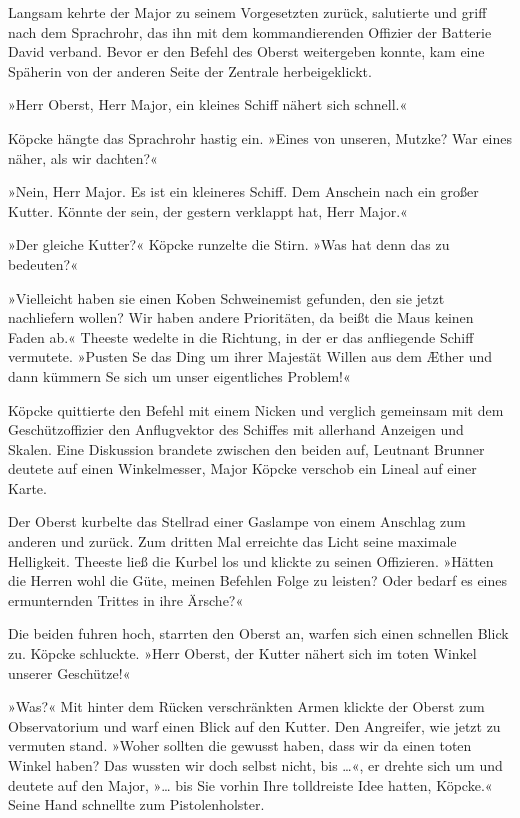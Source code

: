 Langsam kehrte der Major zu seinem Vorgesetzten zurück, salutierte
und griff nach dem Sprachrohr, das ihn mit dem kommandierenden
Offizier der Batterie David verband. Bevor er den Befehl des Oberst
weitergeben konnte, kam eine Späherin von der anderen Seite der
Zentrale herbeigeklickt.

»Herr Oberst, Herr Major, ein kleines Schiff nähert sich schnell.«

Köpcke hängte das Sprachrohr hastig ein. »Eines von unseren,
Mutzke? War eines näher, als wir dachten?«

»Nein, Herr Major. Es ist ein kleineres Schiff. Dem Anschein nach
ein großer Kutter. Könnte der sein, der gestern verklappt hat, Herr
Major.«

»Der gleiche Kutter?« Köpcke runzelte die Stirn. »Was hat denn das
zu bedeuten?«

»Vielleicht haben sie einen Koben Schweinemist gefunden, den sie
jetzt nachliefern wollen? Wir haben andere Prioritäten, da beißt
die Maus keinen Faden ab.« Theeste wedelte in die Richtung, in der
er das anfliegende Schiff vermutete. »Pusten Se das Ding um ihrer
Majestät Willen aus dem Æther und dann kümmern Se sich um unser
eigentliches Problem!«

Köpcke quittierte den Befehl mit einem Nicken und verglich
gemeinsam mit dem Geschützoffizier den Anflugvektor des Schiffes
mit allerhand Anzeigen und Skalen. Eine Diskussion brandete
zwischen den beiden auf, Leutnant Brunner deutete auf einen
Winkelmesser, Major Köpcke verschob ein Lineal auf einer Karte.

Der Oberst kurbelte das Stellrad einer Gaslampe von einem Anschlag
zum anderen und zurück. Zum dritten Mal erreichte das Licht seine
maximale Helligkeit. Theeste ließ die Kurbel los und klickte zu
seinen Offizieren. »Hätten die Herren wohl die Güte, meinen
Befehlen Folge zu leisten? Oder bedarf es eines ermunternden
Trittes in ihre Ärsche?«

Die beiden fuhren hoch, starrten den Oberst an, warfen sich einen
schnellen Blick zu. Köpcke schluckte. »Herr Oberst, der Kutter
nähert sich im toten Winkel unserer Geschütze!«

»Was?« Mit hinter dem Rücken verschränkten Armen klickte der Oberst
zum Observatorium und warf einen Blick auf den Kutter. Den
Angreifer, wie jetzt zu vermuten stand. »Woher sollten die gewusst
haben, dass wir da einen toten Winkel haben? Das wussten wir doch
selbst nicht, bis …«, er drehte sich um und deutete auf den Major,
»… bis Sie vorhin Ihre tolldreiste Idee hatten, Köpcke.« Seine Hand
schnellte zum Pistolenholster.

